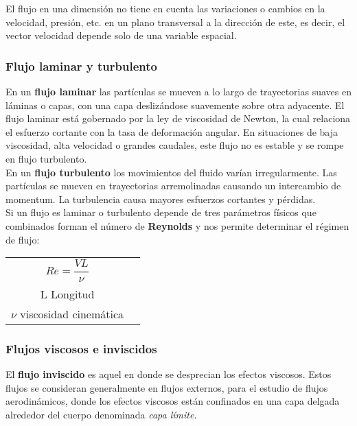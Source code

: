 El flujo en una dimensión no tiene en cuenta las variaciones o cambios en la velocidad, presión, etc. en un plano transversal a la dirección de este, es decir, el vector velocidad depende solo de una variable espacial.



\subsubsection{Flujo laminar y turbulento}

En un \textbf{flujo laminar} las partículas se mueven a lo largo de trayectorias suaves en láminas o capas, con una capa deslizándose suavemente sobre otra adyacente. El flujo laminar está gobernado por la ley de viscosidad de Newton, la cual relaciona el esfuerzo cortante con la tasa de deformación angular. En situaciones de baja viscosidad, alta velocidad o grandes caudales, este flujo no es estable y se rompe en flujo turbulento.\\

En un \textbf{flujo turbulento} los movimientos del fluido varían irregularmente. Las partículas se mueven en trayectorias arremolinadas causando un intercambio de momentum. La turbulencia causa mayores esfuerzos cortantes y pérdidas.\\

Si un flujo es laminar o turbulento depende de tres parámetros físicos que combinados forman el número de \textbf{Reynolds} y nos permite determinar el régimen de flujo:\\

\begin{tabular}{c c}
		\begin{minipage}[t]{.45\textwidth}
			\flushright 
			\vspace{.05cm}
			$Re= \dfrac{V L}{\nu}$
		\end{minipage}
		&
		\begin{minipage}[t]{.45\textwidth}
			\flushleft
			V velocidad\\
			L Longitud\\
			$\nu$ viscosidad cinemática
		\end{minipage}
\end{tabular}

\subsubsection{Flujos viscosos e inviscidos}
El \textbf{flujo inviscido} es aquel en donde se desprecian los efectos viscosos. Estos flujos se consideran generalmente en flujos externos, para el estudio de flujos aerodinámicos, donde los efectos viscosos están confinados en una capa delgada alrededor del cuerpo denominada \emph{capa límite}. \\

